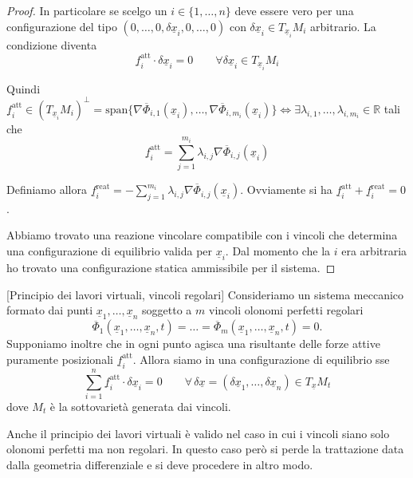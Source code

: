 \begin{proof}
In particolare se scelgo un \(i\in\{1,\ldots,n\}\) deve essere vero per una configurazione del tipo \((0,\ldots,0,\delta \underline{x}_i,0,\ldots,0)\) con \(\delta \underline{x}_i\in T_{\underline{x}_i}M_i\) arbitrario. La condizione diventa
\[
\underline{f}_i^{\mathrm{att}}\cdot \delta \underline{x}_i=0
\qquad
\forall \delta \underline{x}_i\in T_{\underline{x}_i}M_i
\]

Quindi \(\underline{f}_i^{\mathrm{att}}\in (T_{\underline{x}_i}M_i)^{\perp}=\mathrm{span}\{\nabla \overline{\Phi}_{i,1}(\underline{x}_i),\ldots,\nabla \overline{\Phi}_{i,m_i}(\underline{x}_i)\}\Longleftrightarrow \exists \lambda_{i,1},\ldots,\lambda_{i,m_i} \in \mathbb{R}\) tali che
\[
\underline{f}_i^{\mathrm{att}}=\sum_{j=1}^{m_i}\lambda_{i,j}\nabla \overline{\Phi}_{i,j}(\underline{x}_i)
\]

Definiamo allora \(\underline{f}_i^{\mathrm{reat}}=-\sum_{j=1}^{m_i}\lambda_{i,j}\nabla \overline{\Phi}_{i,j}(\underline{x}_i)\). Ovviamente si ha \(\underline{f}_i^{\mathrm{att}}+\underline{f}_i^{\mathrm{reat}}=0\).

Abbiamo trovato una reazione vincolare compatibile con i vincoli che determina una configurazione di equilibrio valida per \(\underline{x}_i\). Dal momento che la \(i\) era arbitraria ho trovato una configurazione statica ammissibile per il sistema.
\end{proof}
\begin{theorem}{}[Principio dei lavori virtuali, vincoli regolari]
Consideriamo un sistema meccanico formato dai punti \(\underline{x}_1,\ldots,\underline{x}_n\) soggetto a \(m\) vincoli olonomi perfetti regolari
\[
\overline{\Phi}_1(\underline{x}_1,\ldots,\underline{x}_n,t)=\ldots=\overline{\Phi}_m(\underline{x}_1,\ldots,\underline{x}_n,t)=0.
\]
Supponiamo inoltre che in ogni punto agisca una risultante delle forze attive puramente posizionali \(\underline{f}_i^{\mathrm{att}}\). Allora siamo in una configurazione di equilibrio sse
\[
\sum_{i=1}^{n}\underline{f}_i^{\mathrm{att}}\cdot \delta \underline{x}_i=0
\qquad
\forall\, \delta \underline{x}=(\delta \underline{x}_1,\ldots,\delta \underline{x}_n)\in T_{\underline{x}}M_t
\]
dove \(M_t\) è la sottovarietà generata dai vincoli.
\end{theorem}
\begin{oss}{}
    Anche il principio dei lavori virtuali è valido nel caso in cui i vincoli siano solo olonomi perfetti ma non regolari. In questo caso però si perde la trattazione data dalla geometria differenziale e si deve procedere in altro modo.
\end{oss}
